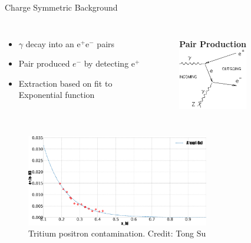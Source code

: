 \documentclass[12pt]{beamer}
\begin{document}
\begin{frame}{Charge Symmetric Background}
\vspace{-0pt}

\begin{columns}
	\vspace*{-0.75cm}
	\begin{itemize}
		\item $\gamma$ decay into an e$^+$e$^-$ pairs
		\item  Pair produced $e^-$ by detecting e$^+$
		\item Extraction based on fit to Exponential function 
	\end{itemize}
	\vspace{-40pt}
	\begin{figure}
		\textbf{Pair Production}
		\includegraphics[width=3.0cm]{../images/pp_FD.png}
	\end{figure}
\end{columns}


\begin{figure}
	\caption*{Tritium positron contamination. Credit: Tong Su}
	\includegraphics[width=8.0cm]{../images/positron_H3_bane.pdf}
\end{figure}




\end{frame}
\end{document}
